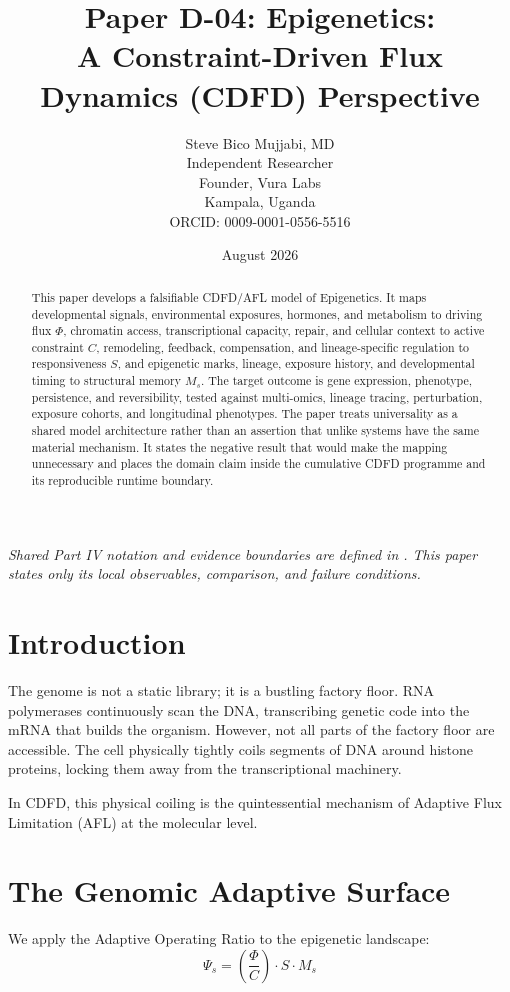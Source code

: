 \documentclass[11pt,a4paper]{article}
\title{\textbf{Paper D-04: Epigenetics:\\ A Constraint-Driven Flux Dynamics (CDFD) Perspective}}
\author{Steve Bico Mujjabi, MD\\
\small Independent Researcher\\
\small Founder, Vura Labs\\
\small Kampala, Uganda\\
\small ORCID: 0009-0001-0556-5516}
\date{August 2026}
\begin{document}
\maketitle

\noindent\textit{Shared Part IV notation and evidence boundaries are defined in . This paper states only its local observables, comparison, and failure conditions.}


\begin{abstract}
This paper develops a falsifiable CDFD/AFL model of Epigenetics. It maps developmental signals, environmental exposures, hormones, and metabolism to driving flux $\Phi$, chromatin access, transcriptional capacity, repair, and cellular context to active constraint $C$, remodeling, feedback, compensation, and lineage-specific regulation to responsiveness $S$, and epigenetic marks, lineage, exposure history, and developmental timing to structural memory $M_s$. The target outcome is gene expression, phenotype, persistence, and reversibility, tested against multi-omics, lineage tracing, perturbation, exposure cohorts, and longitudinal phenotypes. The paper treats universality as a shared model architecture rather than an assertion that unlike systems have the same material mechanism. It states the negative result that would make the mapping unnecessary and places the domain claim inside the cumulative CDFD programme and its reproducible runtime boundary.
\end{abstract}

\section{Introduction}

The genome is not a static library; it is a bustling factory floor. RNA polymerases continuously scan the DNA, transcribing genetic code into the mRNA that builds the organism. However, not all parts of the factory floor are accessible. The cell physically tightly coils segments of DNA around histone proteins, locking them away from the transcriptional machinery.

In CDFD, this physical coiling is the quintessential mechanism of Adaptive Flux Limitation (AFL) at the molecular level.

\section{The Genomic Adaptive Surface}
We apply the Adaptive Operating Ratio to the epigenetic landscape:
\begin{equation}
    \Psi_s = \left( \frac{\Phi}{C} \right) \cdot S \cdot M_s
\end{equation}
\end{document}
